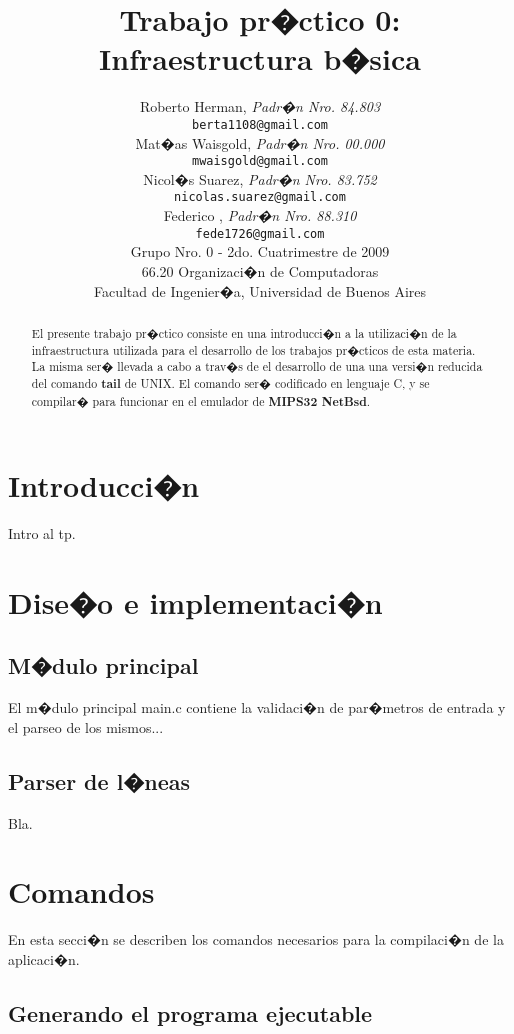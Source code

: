 \documentclass[a4paper,10pt]{article}
\title{		\textbf{Trabajo pr�ctico 0: Infraestructura b�sica}}
\author{		Roberto Herman, \textit{Padr�n Nro. 84.803}                     \\
            \texttt{ berta1108@gmail.com }                                              \\
            Mat�as Waisgold, \textit{Padr�n Nro. 00.000}                     \\
            \texttt{ mwaisgold@gmail.com }                                              \\
            Nicol�s Suarez, \textit{Padr�n Nro. 83.752}                     \\
            \texttt{ nicolas.suarez@gmail.com }                                              \\
            Federico , \textit{Padr�n Nro. 88.310}                     \\
            \texttt{ fede1726@gmail.com }                                              \\[2.5ex]
            \normalsize{Grupo Nro. 0 - 2do. Cuatrimestre de 2009}                       \\
            \normalsize{66.20 Organizaci�n de Computadoras}                             \\
            \normalsize{Facultad de Ingenier�a, Universidad de Buenos Aires}            \\
       }
\date{}
\begin{document}
\maketitle

\thispagestyle{empty}

\begin{abstract}
El presente trabajo pr�ctico consiste en una introducci�n a la utilizaci�n de la infraestructura utilizada para el desarrollo de los trabajos pr�cticos de esta materia. La misma ser� llevada a cabo a trav�s de el desarrollo de una una versi�n reducida del comando \textbf{tail} de UNIX. El comando ser� codificado en lenguaje C, y se compilar� para funcionar en el emulador de \textbf{MIPS32 NetBsd}.
\end{abstract}


\section{Introducci�n}

Intro al tp.


\section{Dise�o e implementaci�n}

\subsection{M�dulo principal}

El m�dulo principal main.c contiene la validaci�n de par�metros de entrada
y el parseo de los mismos...

\subsection{Parser de l�neas}

Bla.

\section{Comandos}

En esta secci�n se describen los comandos necesarios para la compilaci�n de
la aplicaci�n.

\subsection{Generando el programa ejecutable}
\end{document}
